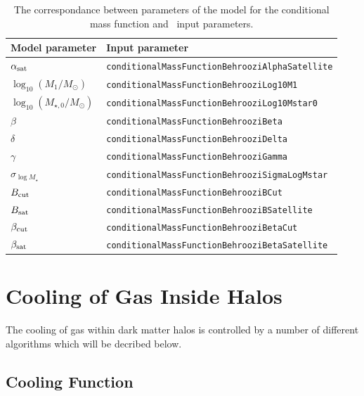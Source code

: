 \begin{table}
 \caption{The correspondance between parameters of the \protect\cite{behroozi_comprehensive_2010} model for the conditional mass function and \protect\glc\ input parameters.}
 \label{tb:Behroozi2010ConditionalMassFunctionParameters}
 \begin{center}
 \begin{tabular}{ll}
  \hline
  {\bf Model parameter} & {\bf Input parameter} \\
  \hline
$\alpha_{\rm sat}$ & {\tt conditionalMassFunctionBehrooziAlphaSatellite} \\
$\log_{10}(M_1/M_\odot)$ & {\tt conditionalMassFunctionBehrooziLog10M1} \\
$\log_{10}(M_{\star,0}/M_\odot)$ & {\tt conditionalMassFunctionBehrooziLog10Mstar0} \\
$\beta$ & {\tt conditionalMassFunctionBehrooziBeta} \\
$\delta$ & {\tt conditionalMassFunctionBehrooziDelta} \\
$\gamma$ & {\tt conditionalMassFunctionBehrooziGamma} \\
$\sigma_{\log M_\star}$ & {\tt conditionalMassFunctionBehrooziSigmaLogMstar} \\
$B_{\rm cut}$ & {\tt conditionalMassFunctionBehrooziBCut} \\
$B_{\rm sat}$ & {\tt conditionalMassFunctionBehrooziBSatellite} \\
$\beta_{\rm cut}$ & {\tt conditionalMassFunctionBehrooziBetaCut} \\
$\beta_{\rm sat}$ & {\tt conditionalMassFunctionBehrooziBetaSatellite} \\
  \hline
 \end{tabular}
 \end{center}
\end{table}

\section{Cooling of Gas Inside Halos}

The cooling of gas within dark matter halos is controlled by a number of different algorithms which will be decribed below.

\subsection{Cooling Function}

